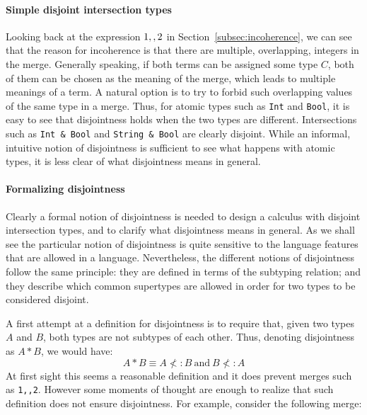 \paragraph{Simple disjoint intersection types}
Looking back at the expression $1 ,, 2$ in
Section~\ref{subsec:incoherence}, we can see that the reason for
incoherence is that there are multiple, overlapping, integers in the
merge. Generally speaking, if both terms can be assigned some type
$C$, both of them can be chosen as the meaning of the merge, which
leads to multiple meanings of a term. A natural option is to try
to forbid such overlapping values of the same type in a merge.
Thus, for atomic types such as \lstinline$Int$ and \lstinline$Bool$, it is
easy to see that disjointness holds when the two types are
different. Intersections such as \lstinline$Int & Bool$ and 
\lstinline$String & Bool$ are clearly disjoint.
While an informal, intuitive notion of disjointness is sufficient to
see what happens with atomic types, it is less clear of what
disjointness means in general.

\paragraph{Formalizing disjointness} 
Clearly a formal notion of disjointness is needed to design a
calculus with disjoint intersection types, and to clarify what
disjointness means in general.
As we shall see the particular notion of disjointness is quite
sensitive to the language features that are allowed in a language.
Nevertheless, the different notions of disjointness follow the same
principle: they are defined in terms of the subtyping relation; and
they describe which common supertypes are allowed in order for 
two types to be considered disjoint.

A first attempt at a definition for disjointness is to require that,
given two types $A$ and $B$, both types are not subtypes of each
other. Thus, denoting disjointness as $A * B$, we would have:
\[A * B \equiv A \not<: B~\text{and}~B \not<: A\]
At first sight this seems a reasonable definition and it does prevent
merges such as \lstinline{1,,2}. However some moments of thought are enough to realize that
such definition does not ensure disjointness. For example, consider
the following merge:

